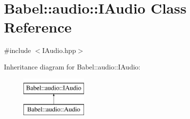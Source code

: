 \hypertarget{classBabel_1_1audio_1_1IAudio}{}\section{Babel\+:\+:audio\+:\+:I\+Audio Class Reference}
\label{classBabel_1_1audio_1_1IAudio}


{\ttfamily \#include $<$I\+Audio.\+hpp$>$}

Inheritance diagram for Babel\+:\+:audio\+:\+:I\+Audio\+:\begin{figure}[H]
\begin{center}
\leavevmode
\includegraphics[height=2.000000cm]{classBabel_1_1audio_1_1IAudio}
\end{center}
\end{figure}
